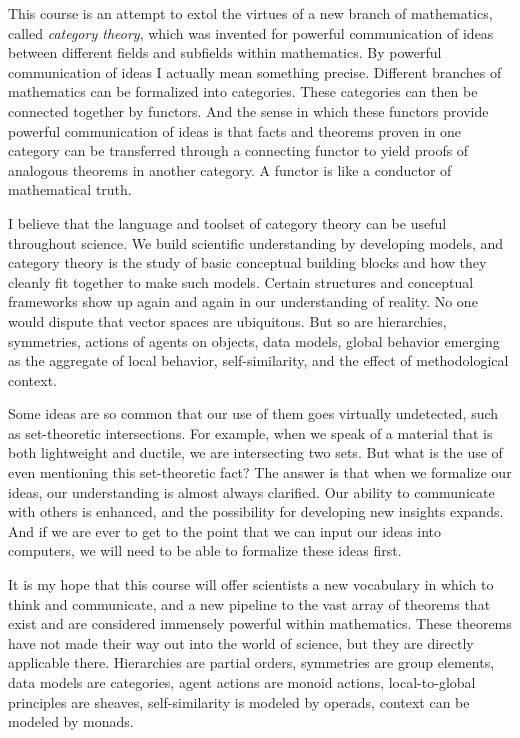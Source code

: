 \documentclass[a4paper]{ltjsbook}
\theoremstyle{remark}
\theoremstyle{definition}
\begin{document}
This course is an attempt to extol the virtues of a new branch of mathematics, called {\em category theory}, which was invented for powerful communication of ideas between different fields and subfields within mathematics. By powerful communication of ideas I actually mean something precise. Different branches of mathematics can be formalized into categories. These categories can then be connected together by functors. And the sense in which these functors provide powerful communication of ideas is that facts and theorems proven in one category can be transferred through a connecting functor to yield proofs of analogous theorems in another category. A functor is like a conductor of mathematical truth.

I believe that the language and toolset of category theory can be useful throughout science. We build scientific understanding by developing models, and category theory is the study of basic conceptual building blocks and how they cleanly fit together to make such models. Certain structures and conceptual frameworks show up again and again in our understanding of reality. No one would dispute that vector spaces are ubiquitous. But so are hierarchies, symmetries, actions of agents on objects, data models, global behavior emerging as the aggregate of local behavior, self-similarity, and the effect of methodological context. 

Some ideas are so common that our use of them goes virtually undetected, such as set-theoretic intersections. For example, when we speak of a material that is both lightweight and ductile, we are intersecting two sets. But what is the use of even mentioning this set-theoretic fact? The answer is that when we formalize our ideas, our understanding is almost always clarified. Our ability to communicate with others is enhanced, and the possibility for developing new insights expands. And if we are ever to get to the point that we can input our ideas into computers, we will need to be able to formalize these ideas first.

It is my hope that this course will offer scientists a new vocabulary in which to think and communicate, and a new pipeline to the vast array of theorems that exist and are considered immensely powerful within mathematics. These theorems have not made their way out into the world of science, but they are directly applicable there. Hierarchies are partial orders, symmetries are group elements, data models are categories, agent actions are monoid actions, local-to-global principles are sheaves, self-similarity is modeled by operads, context can be modeled by monads.
\end{document}
